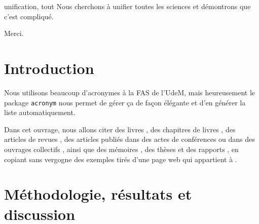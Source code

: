 \documentclass[phd]{dissertum}
\date{Août}{2023}
\begin{document}
  \pagetitre
  \pagejury

  \begin{resume}{unification, tout}
    Nous cherchons à unifier toutes les sciences et démontrons que c'est compliqué.
  \end{resume}

  \begin{abstract}{unification, everything}
    We try to unify all sciences and prove that it is complicated.
  \end{abstract}

  \matieres

    \begin{acronym}
    \end{acronym}


    Merci.

    \lipsum[1-2]


  \chapter{Introduction}
    Nous utilisons beaucoup d'acronymes à la \ac{FAS} de l'\ac{UdeM}, mais heureusement le package \texttt{acronym} nous permet de gérer ça de façon élégante et d'en générer la liste automatiquement.

    Dans cet ouvrage, nous allons citer des livres \citep{livre}, des chapitres de livres \citep{chapitre}, des articles de revues \citep{revue}, des articles publiés dans des actes de conférences \citep{actes} ou dans des ouvrages collectifs \citep{coll}, ainsi que des mémoires \citep{ma}, des thèses \citep{phd} et des rapports \citep{rapport}, en copiant sans vergogne des exemples tirés d'une page web qui appartient à \citet{web}.

  \chapter{Méthodologie, résultats et discussion}
    \lipsum[1]
\end{document}
